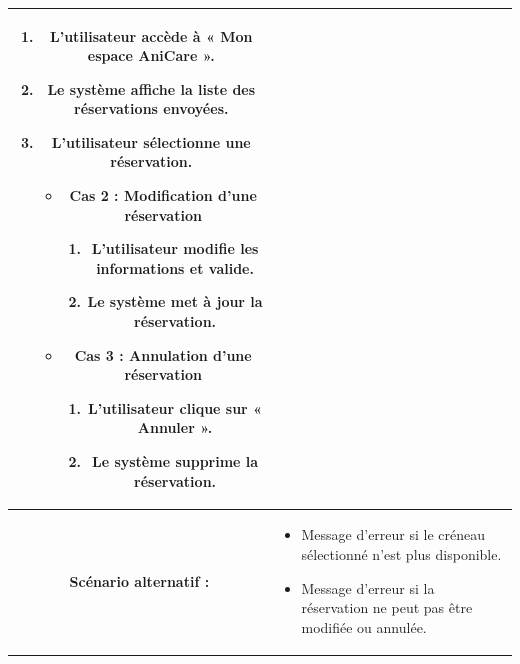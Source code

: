 \begin{longtable}{|c|p{11cm}|}
\begin{enumerate}
\begin{itemize}
\end{itemize}

\item L’utilisateur accède à « Mon espace AniCare ».
\item Le système affiche la liste des réservations envoyées.
\item L’utilisateur sélectionne une réservation.

\begin{itemize}

\item \textbf{Cas 2 : Modification d’une réservation}
\begin{enumerate}
\item L’utilisateur modifie les informations et valide.
\item Le système met à jour la réservation.
\end{enumerate}

\item \textbf{Cas 3 : Annulation d’une réservation}
\begin{enumerate}
\item L’utilisateur clique sur « Annuler ».
\item Le système supprime la réservation.
\end{enumerate}

\end{itemize}

\end{enumerate} \\
\hline

\cellcolor{coloranicare} \textbf{Scénario alternatif :} &
\begin{itemize}
\item Message d’erreur si le créneau sélectionné n’est plus disponible.
\item Message d’erreur si la réservation ne peut pas être modifiée ou annulée.
\end{itemize} \\
\hline

\end{longtable} 
\newpage 
